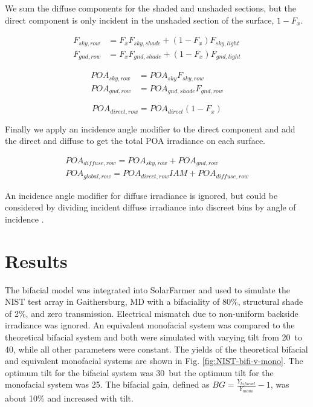 \documentclass[conference]{IEEEtran}
\begin{document}
We sum the diffuse components for the shaded and unshaded sections, but the direct component is only incident in the unshaded section of the surface, $1-F_x$.

\begin{align}
F_{sky,row} &= F_xF_{sky,shade}+\left(1-F_x\right)F_{sky,light}\\
F_{gnd,row} &= F_xF_{gnd,shade}+\left(1-F_x\right)F_{gnd,light}
\end{align}

\begin{align}
POA_{sky,row} &= POA_{sky}F_{sky,row}\\
POA_{gnd,row} &= POA_{gnd,shade}F_{gnd,row}
\end{align}

\begin{equation}
POA_{direct,row} = POA_{direct}\left(1-F_x\right)
\end{equation}

Finally we apply an incidence angle modifier to the direct component and add the direct and diffuse to get the total POA irradiance on each surface.

\begin{align}
POA_{diffuse,row} = POA_{sky,row} + POA_{gnd,row}\\
POA_{global,row} = POA_{direct,row}IAM + POA_{diffuse,row}
\end{align}

An incidence angle modifier for diffuse irradiance is ignored, but could be considered by dividing incident diffuse irradiance into discreet bins by angle of incidence \cite{Marion2017}.

\section{Results}
The bifacial model was integrated into SolarFarmer \cite{Mikofski_8547323} and used to simulate the NIST test array in Gaithersburg, MD \cite{Boyd2017,Boyd2017a,Boyd2017b} with a bifaciality of 80\%, structural shade of 2\%, and zero transmission.  Electrical mismatch due to non-uniform backside irradiance was ignored.  An equivalent monofacial system was compared to the theoretical bifacial system and both were simulated with varying tilt from 20\degree\ to 40\degree, while all other parameters were constant.  The yields of the theoretical bifacial and equivalent monofacial systems are shown in Fig. \ref{fig:NIST-bifi-v-mono}.  The optimum tilt for the bifacial system was 30\degree\, but the optimum tilt for the monofacial system was 25\degree.  The bifacial gain, defined as $BG=\frac{Y_{bifacial}}{Y_{mono}}-1$, was about 10\% and increased with tilt.
\end{document}
